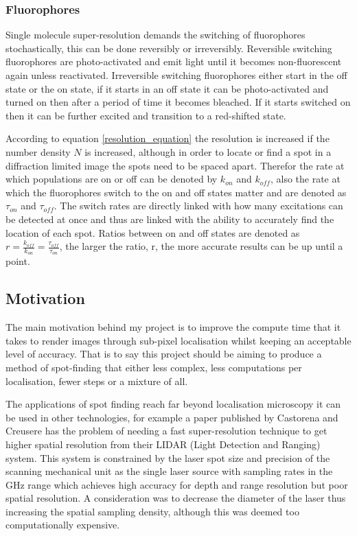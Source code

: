 \documentclass[aps,pra,a4paper,nofootinbib,onecolumn,tightenlines,longbibliography,12pt,amsfonts,amssymb,amsmath,floatfix]{revtex4-2} %
\begin{document}
   \subsubsection{Fluorophores} %
   \label{ssub:Fluorophores}
   
   Single molecule super-resolution demands the switching of fluorophores
   stochastically, this can be done reversibly or irreversibly. Reversible switching fluorophores
   are photo-activated and emit light until it becomes non-fluorescent again unless reactivated.  
   Irreversible switching fluorophores either start in the off state or the on state, if it 
   starts in an off state it can be photo-activated and turned on then after a period of 
   time it becomes bleached. If it starts switched on then it can be further excited 
   and transition to a red-shifted state.\cite{van2011single}

   According to equation \ref{resolution_equation} the resolution is increased 
   if the number density $N$ is increased, although in order to locate or find a spot 
   in a diffraction limited image the spots need to be spaced apart. 
   Therefor the rate at which populations are on or off can be denoted by $k_{on}$ and 
   $k_{off}$, also the rate at which the fluorophores switch to the on and off states matter 
   and are denoted as $\tau_{on}$ and $\tau_{off}$. The switch rates are directly linked with 
   how many excitations can be detected at once and thus are linked with the ability to 
   accurately find the location of each spot. Ratios between on and off states are denoted as 
   $r=\frac{k_{off}}{k_{on}}=\frac{\tau_{off}}{\tau_{on}}$, the larger the ratio, r, the more 
   accurate results can be up until a point.
   

  \subsection{Motivation} %
  \label{sub:Motivation}
  
  The main motivation behind my project is to improve the compute time that it
  takes to render images through sub-pixel localisation whilst keeping an
  acceptable level of accuracy. That is to say this project should be aiming to
  produce a method of spot-finding that either less complex, less computations
  per localisation, fewer steps or a mixture of all. 

  The applications of spot finding reach far beyond localisation microscopy it 
  can be used in other technologies, for example a paper published by Castorena and Creusere \cite{6638050}
  has the problem of needing a fast super-resolution technique to get higher 
  spatial resolution from their LIDAR (Light Detection and Ranging) system. This system is constrained by the 
  laser spot size and precision of the scanning mechanical unit as the single laser 
  source with sampling rates in the GHz range which achieves high accuracy for depth 
  and range resolution but poor spatial resolution. A consideration was to decrease the 
  diameter of the laser thus increasing the spatial sampling density, although this 
  was deemed too computationally expensive.
  
\end{document}
